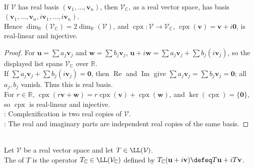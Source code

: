 \begin{proposition} \label{prop:complexification-real-dimension-and-embedding} \\
If $\mathcal{V}$ has real basis $(\mathbf{v}_1,\ldots,\mathbf{v}_n)$, then $\mathcal{V}_{\mathbb{C}}$, as a real vector space, has basis $(\mathbf{v}_1,\ldots,\mathbf{v}_n,i\mathbf{v}_1,\ldots,i\mathbf{v}_n)$.\\
Hence $\dim_{\mathbb{R}}(\mathcal{V}_{\mathbb{C}})=2\dim_{\mathbb{R}}(\mathcal{V})$, and $\operatorname{cpx}:\mathcal{V}\to\mathcal{V}_{\mathbb{C}}$, $\operatorname{cpx}(\mathbf{v})=\mathbf{v}+i\mathbf{0}$, is real-linear and injective.
\begin{proof}
For $\mathbf{u}=\sum a_j\mathbf{v}_j$ and $\mathbf{w}=\sum b_j\mathbf{v}_j$, $\mathbf{u}+i\mathbf{w}=\sum a_j\mathbf{v}_j+\sum b_j(i\mathbf{v}_j)$, so the displayed list spans $\mathcal{V}_{\mathbb{C}}$ over $\mathbb{R}$.\\
If $\sum a_j\mathbf{v}_j+\sum b_j(i\mathbf{v}_j)=\mathbf{0}$, then $\operatorname{Re}$ and $\operatorname{Im}$ give $\sum a_j\mathbf{v}_j=\sum b_j\mathbf{v}_j=\mathbf{0}$; all $a_j,b_j$ vanish. Thus this is real basis.\\
For $r\in\mathbb{R}$, $\operatorname{cpx}(r\mathbf{v}+\mathbf{w})=r\operatorname{cpx}(\mathbf{v})+\operatorname{cpx}(\mathbf{w})$, and $\ker(\operatorname{cpx})=\{\mathbf{0}\}$, so $\operatorname{cpx}$ is real-linear and injective.\\
: Complexification is two real copies of $\mathcal{V}$.\\
: The real and imaginary parts are independent real copies of the same basis.
\end{proof}
\end{proposition}

\begin{definition} \label{def:complexification-real-operator} \\
Let $\mathcal{V}$ be a real vector space and let $T\in\LL(\mathcal{V})$.\\
The  of $T$ is the operator $T_{\mathbb{C}}\in\LL(\mathcal{V}_{\mathbb{C}})$ defined by $T_{\mathbb{C}}(\mathbf{u}+i\mathbf{v})\defeq T\mathbf{u}+iT\mathbf{v}$.
\end{definition}

